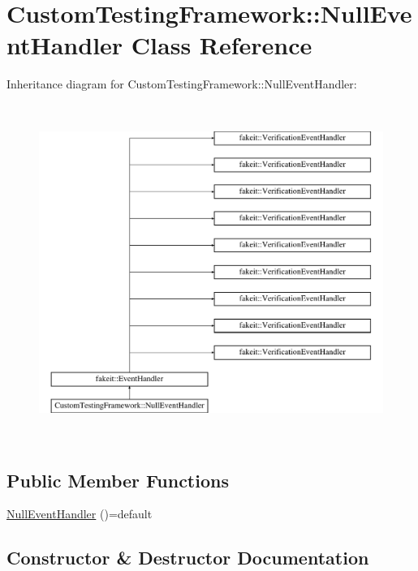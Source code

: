 \hypertarget{classCustomTestingFramework_1_1NullEventHandler}{}\section{Custom\+Testing\+Framework\+::Null\+Event\+Handler Class Reference}
\label{classCustomTestingFramework_1_1NullEventHandler}
Inheritance diagram for Custom\+Testing\+Framework\+::Null\+Event\+Handler\+:\begin{figure}[H]
\begin{center}
\leavevmode
\includegraphics[height=11.000000cm]{classCustomTestingFramework_1_1NullEventHandler}
\end{center}
\end{figure}
\subsection*{Public Member Functions}
\begin{DoxyCompactItemize}
\item 
\mbox{\hyperlink{classCustomTestingFramework_1_1NullEventHandler_aef8a9b61f83848ed7a043594b2710fd9}{Null\+Event\+Handler}} ()=default
\end{DoxyCompactItemize}


\subsection{Constructor \& Destructor Documentation}
\mbox{\label{classCustomTestingFramework_1_1NullEventHandler_aef8a9b61f83848ed7a043594b2710fd9}} 

